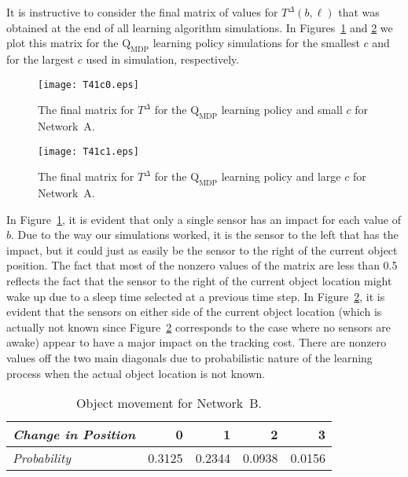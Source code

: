 \documentclass[journal,draftcls,onecolumn,11pt]{IEEEtran}
\newcommand{\QMDP}{$\text{Q}_{\text{MDP}}$}
\begin{document}
It is instructive to consider the final matrix of values for $T^\Delta(b,\ell)$ that was obtained at the end of all learning algorithm simulations.  In Figures~\ref{fig:T41c0} and \ref{fig:T41c1} we plot this matrix for the \QMDP{} learning policy simulations for the smallest $c$ and for the largest $c$ used in simulation, respectively.
\begin{figure}
   \begin{center}
      \texttt{[image: T41c0.eps]}
      \caption{The final matrix for $T^\Delta$ for the \QMDP{} learning policy and small $c$ for Network~A. \label{fig:T41c0}}
   \end{center}
\end{figure}
\begin{figure}
   \begin{center}
      \texttt{[image: T41c1.eps]}
      \caption{The final matrix for $T^\Delta$ for the \QMDP{} learning policy and large $c$ for Network~A. \label{fig:T41c1}}
   \end{center}
\end{figure}
In Figure~\ref{fig:T41c0}, it is evident that only a single sensor has an impact for each value of $b$.  Due to the way our simulations worked, it is the sensor to the left that has the impact, but it could just as easily be the sensor to the right of the current object position. The fact that most of the nonzero values of the matrix are less than 0.5 reflects the fact that the sensor to the right of the current object location might wake up due to a sleep time selected at a previous time step.  In Figure~\ref{fig:T41c1}, it is evident that the sensors on either side of the current object location (which is actually not known since Figure~\ref{fig:T41c1} corresponds to the case where no sensors are awake) appear to have a major impact on the tracking cost.  There are nonzero values off the two main diagonals due to probabilistic nature of the learning process when the actual object location is not known.

\begin{table}
   \begin{center}
      \caption{Object movement for Network~B. \label{tab:moves}}
      \begin{tabular}{|l|r|r|r|r|}
         \hline
         {\em Change in Position} & 0 & 1 & 2 & 3  \\ \hline
         {\em Probability} & 0.3125 & 0.2344 & 0.0938 & 0.0156 \\ \hline
      \end{tabular}
   \end{center}
\end{table}
\end{document}
